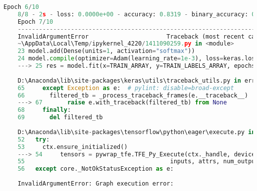 \begin{lstlisting}[language=Python]
	Epoch 6/10
	8/8 - 2s - loss: 0.0000e+00 - accuracy: 0.8319 - binary_accuracy: 0.8319 - true_positives_2: 198.0000 - true_negatives_2: 0.0000e+00 - false_positives_2: 40.0000 - false_negatives_2: 0.0000e+00 - precision_at_recall_2: 0.8319 - val_loss: 0.0000e+00 - val_accuracy: 0.9054 - val_binary_accuracy: 0.9054 - val_true_positives_2: 67.0000 - val_true_negatives_2: 0.0000e+00 - val_false_positives_2: 7.0000 - val_false_negatives_2: 0.0000e+00 - val_precision_at_recall_2: 0.9054 - 2s/epoch - 227ms/step
	Epoch 7/10
	---------------------------------------------------------------------------
	InvalidArgumentError                      Traceback (most recent call last)
	~\AppData\Local\Temp/ipykernel_4220/1411090259.py in <module>
	23 model.add(Dense(units=1, activation="softmax"))
	24 model.compile(optimizer=Adam(learning_rate=1e-3), loss=keras.losses.categorical_crossentropy, metrics=[Accuracy(), BinaryAccuracy(), TruePositives(), TrueNegatives(), FalsePositives(), FalseNegatives(), PrecisionAtRecall(0.9)])
	---> 25 res = model.fit(x=TRAIN_ARRAY, y=TRAIN_LABELS_ARRAY, epochs=10, verbose=2, validation_data = (VALIDATION_ARRAY, VALIDATION_LABELS_ARRAY) )
	
	D:\Anaconda\lib\site-packages\keras\utils\traceback_utils.py in error_handler(*args, **kwargs)
	65     except Exception as e:  # pylint: disable=broad-except
	66       filtered_tb = _process_traceback_frames(e.__traceback__)
	---> 67       raise e.with_traceback(filtered_tb) from None
	68     finally:
	69       del filtered_tb
	
	D:\Anaconda\lib\site-packages\tensorflow\python\eager\execute.py in quick_execute(op_name, num_outputs, inputs, attrs, ctx, name)
	52   try:
	53     ctx.ensure_initialized()
	---> 54     tensors = pywrap_tfe.TFE_Py_Execute(ctx._handle, device_name, op_name,
	55                                         inputs, attrs, num_outputs)
	56   except core._NotOkStatusException as e:
	
	InvalidArgumentError: Graph execution error:
	

\end{lstlisting}
